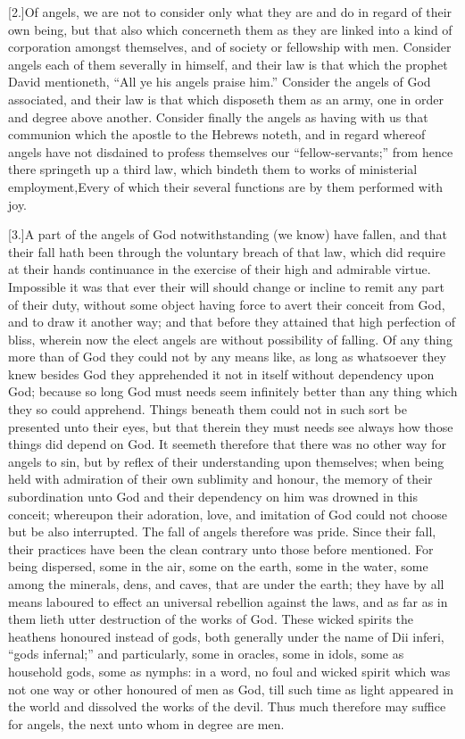 [2.]Of angels, we are not to consider only what they are and do in regard of their own being, but that also which concerneth them as they are linked into a kind of corporation amongst themselves, and of society or fellowship with men. Consider angels each of them severally in himself, and their law is that which the prophet David mentioneth, “All ye his angels praise him.” Consider the angels of God associated, and their law is that which disposeth them as an army, one in order and degree above another. Consider finally the angels as having with us that communion which the apostle to the Hebrews noteth, and in regard whereof  angels have not disdained to profess themselves our “fellow-servants;” from hence there springeth up a third law, which bindeth them to works of ministerial employment,Every of which their several functions are by them performed with joy.

[3.]A part of the angels of God notwithstanding (we know) have fallen, and that their fall hath been through the voluntary breach of that law, which did require at their hands continuance in the exercise of their high and admirable virtue. Impossible it was that ever their will should change or incline to remit any part of their duty, without some object having force to avert their conceit from God, and to draw it another way; and that before they attained that high perfection of bliss, wherein now the elect angels are without possibility of falling. Of any thing more than of God they could not by any means like, as long as whatsoever they knew besides God they apprehended it not in itself without dependency upon God; because so long God must needs seem infinitely better than any thing which they so could apprehend. Things beneath them could not in such sort be presented unto their eyes, but that therein they must needs see always how those things did depend on God. It seemeth therefore that there was no other way for angels to sin, but by reflex of their understanding upon themselves; when being held with admiration of their own sublimity and honour, the memory of their subordination unto God and their dependency on him was drowned in this conceit; whereupon their adoration, love, and imitation of God could not choose but be also interrupted. The fall of angels therefore was pride. Since their fall, their practices have been the clean contrary unto those before mentioned. For being dispersed,  some in the air, some on the earth, some in the water, some among the minerals, dens, and caves, that are under the earth; they have by all means laboured to effect an universal rebellion against the laws, and as far as in them lieth utter destruction of the works of God. These wicked spirits the heathens honoured instead of gods, both generally under the name of Dii inferi, “gods infernal;” and particularly, some in oracles, some in idols, some as household gods, some as nymphs: in a word, no foul and wicked spirit which was not one way or other honoured of men as God, till such time as light appeared in the world and dissolved the works of the devil. Thus much therefore may suffice for angels, the next unto whom in degree are men.

